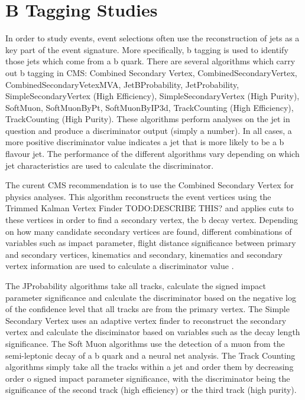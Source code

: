 \chapter{B Tagging Studies}
\label{c:b_tagging_studies}

In order to study \ttbar events, event selections often use the reconstruction of jets as a key part of the
event signature. More specifically, b tagging is used to identify those jets which come from a b quark. There
are several algorithms which carry out b tagging in CMS: Combined Secondary Vertex, CombinedSecondaryVertex,
CombinedSecondaryVetexMVA, JetBProbability, JetProbability, SimpleSecondaryVertex (High Efficiency),
SimpleSecondaryVertex (High Purity), SoftMuon, SoftMuonByPt, SoftMuonByIP3d, TrackCounting (High Efficiency),
TrackCounting (High Purity). These algorithms perform analyses on the jet in question and produce a
discriminator output (simply a number). In all cases, a more positive discriminator value indicates a jet that
is more likely to be a b flavour jet. The performance of the different algorithms vary depending on which jet
characteristics are used to calculate the discriminator.

The curent CMS recommendation is to use the Combined Secondary Vertex for physics analyses. This algorithm
reconstructs the event vertices using the Trimmed Kalman Vertex Finder TODO:DESCRIBE THIS?
and applies cuts to these vertices in order to find a secondary vertex, the b decay vertex.
Depending on how many candidate secondary vertices are found, different combinations of variables such as
impact parameter, flight distance significance between primary and secondary vertices, kinematics and
secondary, kinematics and secondary vertex information are used to calculate a discriminator value \cite{CSV}.

The JProbability algorithms take all tracks, calculate the signed impact parameter significance and calculate
the discriminator based on the negative log of the confidence level that all tracks are from the primary
vertex. The Simple Secondary Vertex uses an adaptive vertex finder to reconstruct the secondary vertex and
calculate the disciminator based on variables such as the decay length significance. The Soft Muon algorithms
use the detection of a muon from the semi-leptonic decay of a b quark and a neural net analysis. The Track
Counting algorithms simply take all the tracks within a jet and order them by decreasing order o signed impact
parameter significance, with the discriminator being the significance of the second track (high efficiency) or
the third track (high purity).

